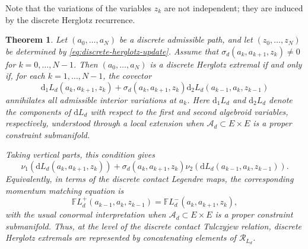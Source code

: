 \documentclass[11pt]{article}
\newtheorem{theorem}{Theorem}[section]
\newcommand{\dd}{\mathrm{d}}
\newcommand{\mc}[1]{\mathcal{#1}}
\newcommand{\FL}{\mathbb{F}L}
\begin{document}
Note that the variations of the variables \(z_k\) are not independent; they are
induced by the discrete Herglotz recurrence.

\begin{theorem}
\label{thm:discrete-ELH}
Let \((a_0,\dots,a_N)\) be a discrete admissible path, and let
\((z_0,\dots,z_N)\) be determined by
\eqref{eq:discrete-herglotz-update}. Assume that
$\sigma_d(a_k,a_{k+1},z_k)\neq 0$ for $k=0,\dots,N-1$.
Then \((a_0,\dots,a_N)\) is a discrete Herglotz extremal if and only if, for
each \(k=1,\dots,N-1\), the covector
\[
\dd_1 L_d(a_k,a_{k+1},z_k)
+
\sigma_d(a_k,a_{k+1},z_k)
\dd_2 L_d(a_{k-1},a_k,z_{k-1})
\]
annihilates all admissible interior variations at \(a_k\). Here
\(\dd_1L_d\) and \(\dd_2L_d\) denote the components of \(\dd L_d\) with
respect to the first and second algebroid variables, respectively, understood
through a local extension when \(\mc A_d\subset E\times E\) is a proper
constraint submanifold.

Taking vertical parts, this condition gives
\[
\nu_1(\dd L_d(a_k,a_{k+1},z_k))
+
\sigma_d(a_k,a_{k+1},z_k)
\nu_2(\dd L_d(a_{k-1},a_k,z_{k-1})).
\]
Equivalently, in terms of the discrete contact Legendre maps, the corresponding
momentum matching equation is
\[
\FL_d^+(a_{k-1},a_k,z_{k-1})
=
\FL_d^-(a_k,a_{k+1},z_k),
\]
with the usual conormal interpretation when \(\mc A_d\subset E\times E\) is a
proper constraint submanifold. Thus, at the level of the discrete contact
Tulczyjew relation, discrete Herglotz extremals are represented by
concatenating elements of \(\mc R_{L_d}\).
\end{theorem}
\end{document}
